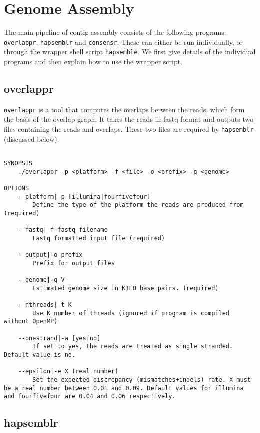 \documentclass[12pt,a4paper]{report}
\begin{document}
\section{Genome Assembly}
\label{assem}

The main pipeline of contig assembly consists of the following programs: \texttt{overlappr}, \texttt{hapsemblr} and \texttt{consensr}. These can either be run individually, or through the wrapper shell script \texttt{hapsemble}. We first give details of the individual programs and then explain how to use the wrapper script.

\subsection{overlappr}

\texttt{overlappr} is a tool that computes the overlaps between the reads, which form the basis of the overlap graph. It takes the reads in fastq format and outputs two files containing the reads and overlaps. These two files are required by \texttt{hapsemblr} (discussed below).

\begin{lstlisting}

SYNOPSIS
    ./overlappr -p <platform> -f <file> -o <prefix> -g <genome>

OPTIONS 
    --platform|-p [illumina|fourfivefour] 
        Define the type of the platform the reads are produced from (required) 

    --fastq|-f fastq_filename 
        Fastq formatted input file (required) 

    --output|-o prefix 
        Prefix for output files 

    --genome|-g V 
        Estimated genome size in KILO base pairs. (required) 

    --nthreads|-t K 
        Use K number of threads (ignored if program is compiled without OpenMP) 

    --onestrand|-a [yes|no] 
        If set to yes, the reads are treated as single stranded. Default value is no. 

    --epsilon|-e X (real number) 
        Set the expected discrepancy (mismatches+indels) rate. X must be a real number between 0.01 and 0.09. Default values for illumina and fourfivefour are 0.04 and 0.06 respectively. 

\end{lstlisting}

\subsection{hapsemblr}
\end{document}
